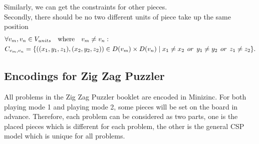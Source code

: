 Similarly, we can get the constraints for other pieces.
\\Secondly, there should be no two different units of piece take up the same position
\begin{equation}
\label{equ:3Dfirstconstrain}
\begin{aligned}
&\forall v_{m},v_{n} \in \VUnits\quad \text{where} \quad v_{m} \neq v_{n}:\\
&\Constraints{m}{n}=\{((x_{1},y_{1},z_{1}),(x_{2},y_{2},z_{2}))\in \Domain{m} \times \Domain{n}\mid x_{1} \neq x_{2}   \hspace{1ex} or \hspace{1ex}  y_{1} \neq y_{2} \hspace{1ex} or \hspace{1ex}  z_{1} \neq z_{2}\}.
\end{aligned}
\end{equation}
\subsection{Encodings for Zig Zag Puzzler}
All problems in the Zig Zag Puzzler booklet are encoded in Minizinc. For both playing mode 1 and playing mode 2, some pieces will be set on the board in advance. Therefore, each problem can be considered as two parts, one is the placed pieces which is different for each problem, the other is the general CSP model which is unique for all problems. 
